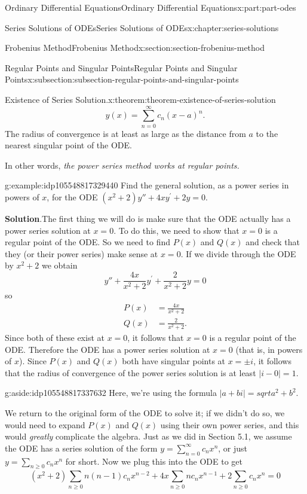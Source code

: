 \documentclass[twoside,10pt,]{book}
\newcommand{\blocktitlefont}{\relax}
\numberwithin{equation}{part}
\newcommand{\amp}{&}
\begin{document}
\begin{partptx}{Ordinary Differential Equations}{}{Ordinary Differential Equations}{}{}{x:part:part-odes}
\begin{chapterptx}{Series Solutions of ODEs}{}{Series Solutions of ODEs}{}{}{x:chapter:series-solutions}
\begin{sectionptx}{Frobenius Method}{}{Frobenius Method}{}{}{x:section:section-frobenius-method}
\begin{subsectionptx}{Regular Points and Singular Points}{}{Regular Points and Singular Points}{}{}{x:subsection:subsection-regular-points-and-singular-points}
\begin{theorem}{Existence of Series Solution.}{}{x:theorem:theorem-existence-of-series-solution}
\begin{equation*}
y(x) = \sum_{n=0}^{\infty}c_{n}(x-a)^{n}.
\end{equation*}
The radius of convergence is at least as large as the distance from \(a\) to the nearest singular point of the ODE.%
\end{theorem}
In other words, \emph{the power series method works at regular points.}%
\begin{example}{}{g:example:idp105548817329440}%
Find the general solution, as a power series in powers of \(x\), for the ODE \((x^{2}+2)y''+4xy^\prime+2y=0\).%
\par\smallskip%
\noindent\textbf{\blocktitlefont Solution}.\hypertarget{g:solution:idp105548817330720}{}\quad{}The first thing we will do is make sure that the ODE actually has a power series solution at \(x=0\). To do this, we need to show that \(x=0\) is a regular point of the ODE. So we need to find \(P(x)\) and \(Q(x)\) and check that they (or their power series) make sense at \(x=0\). If we divide through the ODE by \(x^{2}+2\) we obtain%
\begin{equation*}
y''+\frac{4x}{x^{2}+2}y^\prime+\frac{2}{x^{2}+2}y = 0
\end{equation*}
so%
\begin{align*}
P(x) \amp= \frac{4x}{x^{2}+2}\\
Q(x) \amp= \frac{2}{x^{2}+2}\text{.}
\end{align*}
Since both of these exist at \(x=0\), it follows that \(x=0\) is a regular point of the ODE. Therefore the ODE has a power series solution at \(x=0\) (that is, in powers of \(x\)). Since \(P(x)\) and \(Q(x)\) both have singular points at \(x=\pm i\), it follows that the radius of convergence of the power series solution is at least \(|i - 0| = 1\).%
\begin{aside}{}{g:aside:idp105548817337632}%
Here, we're using the formula \(|a+bi| = sqrt{a^2 + b^2}.\)%
\end{aside}
We return to the original form of the ODE to solve it; if we didn't do so, we would need to expand \(P(x)\) and \(Q(x)\) using their own power series, and this would \emph{greatly} complicate the algebra. Just as we did in Section 5.1, we assume the ODE has a series solution of the form \(y = \sum_{n=0}^{\infty}c_{n}x^{n}\), or just \(y=\sum_{n\geq0}c_{n}x^{n}\) for short. Now we plug this into the ODE to get%
\begin{equation*}
(x^{2}+2)\sum_{n\geq0}^{}n(n-1)c_{n}x^{n-2}+4x\sum_{n\geq0}^{}nc_{n}x^{n-1}+2\sum_{n\geq0}^{}c_{n}x^{n} = 0

\end{equation*}
\end{example}
\end{subsectionptx}
\end{sectionptx}
\end{chapterptx}
\end{partptx}
\end{document}
